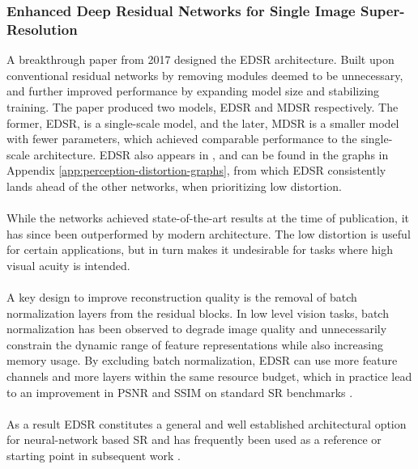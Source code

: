 \subsubsection{Enhanced Deep Residual Networks for Single Image Super-Resolution} \label{sec: edsr relatedworks}
A breakthrough paper from 2017 designed the \acf{EDSR} architecture. Built upon conventional residual networks by removing modules deemed to be unnecessary, and further improved performance by expanding model size and stabilizing training. The paper produced two models, \acs{EDSR} and \acf{MDSR} respectively. The former, \acs{EDSR}, is a single-scale model, and the later, \acs{MDSR} is a smaller model with fewer parameters, which achieved comparable performance to the single-scale architecture. \acs{EDSR} also appears in \cite{Blau2018PerceptionDistortion}, and can be found in the graphs in Appendix \ref{app:perception-distortion-graphs}, from which \acs{EDSR} consistently lands ahead of the other networks, when prioritizing low distortion.
\\\\
While the networks achieved state-of-the-art results at the time of publication, it has since been outperformed by modern architecture. The low distortion is useful for certain applications, but in turn makes it undesirable for tasks where high visual acuity is intended. 
\\\\
A key design to improve reconstruction quality is the removal of batch normalization layers from the residual blocks. In low level vision tasks, batch normalization has been observed to degrade image quality and unnecessarily constrain the dynamic range of feature representations while also increasing memory usage. By excluding batch normalization, \acs{EDSR} can use more feature channels and more layers within the same resource budget, which in practice lead to an improvement in \acs{PSNR} and \acs{SSIM} on standard \acs{SR} benchmarks \cite{lim2017edsr}.
\\\\
As a result \acs{EDSR} constitutes a general and well established architectural option for neural-network based \acs{SR} and has frequently been used as a reference or starting point in subsequent work \cite{lim2017edsr}.

